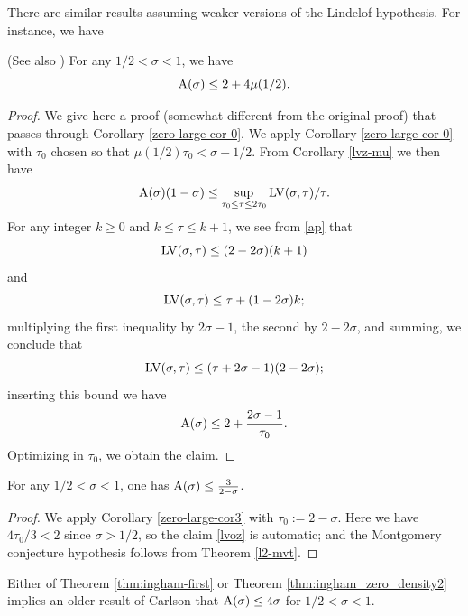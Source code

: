 There are similar results assuming weaker versions of the Lindelof hypothesis. For instance, we have

\begin{theorem}\label{thm:ingham-first} \cite{ingham_difference_1937} (See also \cite{titchmarsh_theory_1986}) For any $1/2 < \sigma < 1$, we have
    $$ \mathrm{A}(\sigma) \leq 2 + 4 \mu(1/2).$$
\end{theorem}

\begin{proof} We give here a proof (somewhat different from the original proof) that passes through Corollary \ref{zero-large-cor-0}.
We apply Corollary \ref{zero-large-cor-0} with $\tau_0$ chosen so that $\mu(1/2) \tau_0 < \sigma-1/2$. From Corollary \ref{lvz-mu} we then have
$$ \mathrm{A}(\sigma)(1-\sigma) \leq \sup_{\tau_0 \leq \tau \leq 2\tau_0} \mathrm{LV}(\sigma,\tau)/\tau.$$
For any integer $k \geq 0$ and $k \leq \tau \leq k+1$, we see from \eqref{ap} that
$$ \mathrm{LV}(\sigma,\tau) \leq (2-2\sigma)(k+1)$$
and
$$ \mathrm{LV}(\sigma,\tau) \leq \tau + (1-2\sigma)k;$$
multiplying the first inequality by $2\sigma-1$, the second by $2-2\sigma$, and summing, we conclude that
$$ \mathrm{LV}(\sigma,\tau) \leq (\tau + 2\sigma-1) (2-2\sigma);$$
inserting this bound we have
$$ \mathrm{A}(\sigma) \leq 2 + \frac{2\sigma-1}{\tau_0}.$$
Optimizing in $\tau_0$, we obtain the claim.
\end{proof}

\begin{theorem}\label{thm:ingham_zero_density2}\cite{ingham_estimation_1940} For any $1/2 < \sigma < 1$, one has $\mathrm{A}(\sigma) \leq \frac{3}{2-\sigma}$.
\end{theorem}
\literature
{}
\derived
{}

\begin{proof}
We apply Corollary \ref{zero-large-cor3} with $\tau_0 := 2-\sigma$.  Here we have $4\tau_0/3 < 2$ since $\sigma>1/2$, so the claim \eqref{lvoz} is automatic; and the Montgomery conjecture hypothesis follows from Theorem \ref{l2-mvt}.
\end{proof}

Either of Theorem \ref{thm:ingham-first} or Theorem \ref{thm:ingham_zero_density2} implies an older result of Carlson \cite{carlson_uber_1921} that $\mathrm{A}(\sigma) \le 4\sigma$ for $1/2 < \sigma < 1$.
\literature
{}

